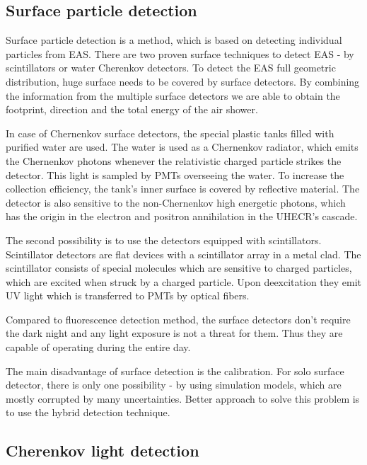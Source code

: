 \subsection{Surface particle detection}
Surface particle detection is a method, which is based on detecting individual particles from EAS. There are two proven surface techniques to detect EAS - by scintillators or water Cherenkov detectors. To detect the EAS full geometric distribution, huge surface needs to be covered by surface detectors. By combining the information from the multiple surface detectors we are able to obtain the footprint, direction and the total energy of the air shower.
\par
In case of Chernenkov surface detectors, the special plastic tanks filled with purified water are used. The water is used as a Chernenkov radiator, which emits the Chernenkov photons whenever the relativistic charged particle strikes the detector. This light is sampled by PMTs overseeing the water.
To increase the collection efficiency, the tank's inner surface is covered by reflective material. The detector is also sensitive to the non-Chernenkov high energetic photons, which has the origin in the electron and positron annihilation in the UHECR's cascade.
\par
The second possibility is to use the detectors equipped with scintillators. Scintillator detectors are flat devices with a scintillator array in a metal clad. The scintillator consists of special molecules which are sensitive to charged particles, which are excited when struck by a charged particle. Upon deexcitation they emit UV light which is transferred to PMTs by optical fibers.
\par
Compared to fluorescence detection method, the surface detectors don't require the dark night and any light exposure is not a threat for them. Thus they are capable of operating during the entire day. 

\par
The main disadvantage of surface detection is the calibration. For solo surface detector, there is only one possibility - by using simulation models, which are mostly corrupted by many uncertainties. Better approach to solve this problem is to use the hybrid detection technique.


\subsection{Cherenkov light detection}


